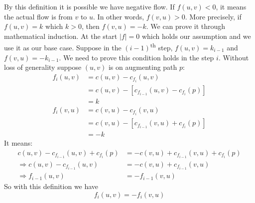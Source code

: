 \documentclass{book}
\begin{document}
	By this definition it is possible we have negative flow. If $f(u, v) < 0$, it means the actual flow is from $v$ to $u$. In other words, $f(v, u) > 0$. More precisely, if $f(u, v) = k$ which $k > 0$, then $f(v, u) = -k$. We can prove it through mathematical induction. At the start $|f| = 0$ which holds our assumption and we use it as our base case. Suppose in the $(i - 1)$\textsuperscript{th} step, $f(u, v) = k_{i - 1}$ and $f(v, u) = -k_{i - 1}$. We need to prove this condition holds in the step $i$. Without loss of generality suppose $(u, v)$ is on augmenting path $p$:
	\begin{equation*}
		\begin{split}
		f_i(u, v) &= c(u, v) - c_{f_i}(u, v) \\
		&= c(u, v) - [c_{f_{i - 1}}(u, v) - c_{f_i}(p)] \\
		&= k
		\end{split}	
	\end{equation*}
	\begin{equation*}
		\begin{split}
		f_i(v, u) &= c(v, u) - c_{f_i}(v, u) \\
		&= c(v, u) - [c_{f_{i - 1}}(v, u) + c_{f_i}(p)] \\
		&= -k
		\end{split}
	\end{equation*}
	It means:
	\begin{equation*}
		\begin{split}
		c(u, v) - c_{f_{i - 1}}(u, v) + c_{f_i}(p) &= -c(v, u) + c_{f_{i - 1}}(v, u) + c_{f_i}(p)\\
		\Rightarrow c(u, v) - c_{f_{i - 1}}(u, v) &= -c(v, u) + c_{f_{i - 1}}(v, u) \\
		\Rightarrow f_{i - 1}(u, v) &= -f_{i - 1}(v, u)
		\end{split}
	\end{equation*}
	So with this definition we have
	\begin{equation}
		f_i(u, v) = -f_i(v, u)
	\end{equation}
\end{document}
